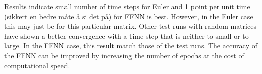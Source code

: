 Results indicate small number of time steps for Euler and 1 point per unit time (sikkert en bedre måte å si det på) for FFNN is best. However, in the Euler case this may just be for this particular matrix. Other test runs with random matrices have shown a better convergence with a time step that is neither to small or to large. In the FFNN case, this result match those of the test runs. The accuracy of the FFNN can be improved by increasing the number of epochs at the cost of computational speed.  




